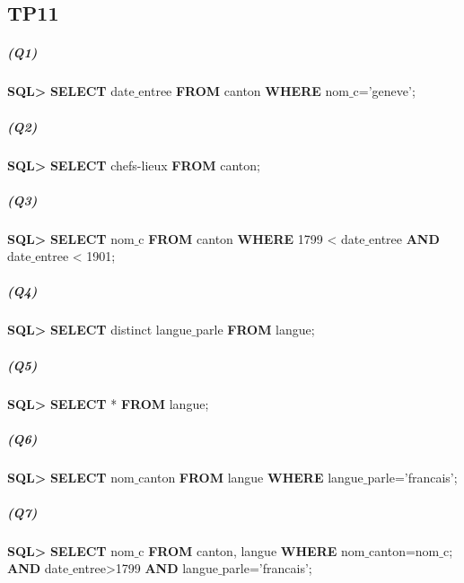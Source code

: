 \documentclass[12pt]
{report}
\begin{document}
\pagestyle{fancy}

\begin{center}
	\section*{\textbf{TP11}}
\end{center}
\bigskip

\subparagraph*{\textbf{(Q1)}} \textbf{SQL>} \textbf{SELECT} date$\_$entree \textbf{FROM} canton \textbf{WHERE} nom$\_$c='geneve';

\subparagraph*{\textbf{(Q2)}} \textbf{SQL>} \textbf{SELECT} chefs-lieux \textbf{FROM} canton;

\subparagraph*{\textbf{(Q3)}} \textbf{SQL>} \textbf{SELECT} nom$\_$c \textbf{FROM} canton \textbf{WHERE} 1799 < date$\_$entree \textbf{AND} date$\_$entree < 1901;

\subparagraph*{\textbf{(Q4)}} \textbf{SQL>} \textbf{SELECT} distinct langue$\_$parle \textbf{FROM} langue;


\subparagraph*{\textbf{(Q5)}} \textbf{SQL>} \textbf{SELECT} * \textbf{FROM} langue;

\subparagraph*{\textbf{(Q6)}} \textbf{SQL>} \textbf{SELECT} nom$\_$canton \textbf{FROM} langue \textbf{WHERE} langue$\_$parle='francais';

\subparagraph*{\textbf{(Q7)}} \textbf{SQL>} \textbf{SELECT} nom$\_$c \textbf{FROM} canton, langue \textbf{WHERE} nom$\_$canton=nom$\_$c; \textbf{AND} date$\_$entree>1799 \textbf{AND} langue$\_$parle='francais';
\end{document}
